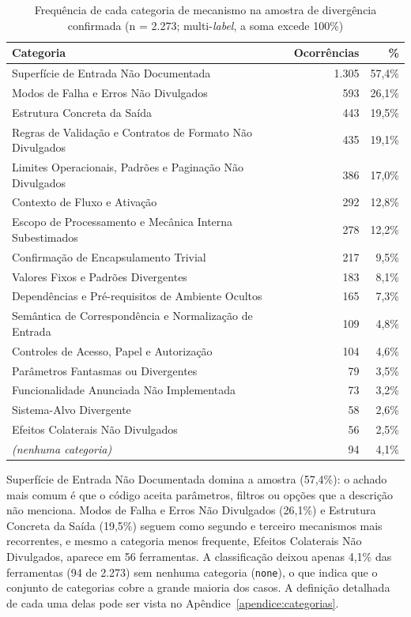 \begin{table}[htbp]
\centering
\caption{Frequência de cada categoria de mecanismo na amostra de divergência confirmada (n = 2.273; multi-\textit{label}, a soma excede 100\%)}
\label{tab:frequencia-categorias}
\footnotesize
\begin{tabular}{lrr}
\toprule
\textbf{Categoria} & \textbf{Ocorrências} & \textbf{\%} \\
\midrule
Superfície de Entrada Não Documentada & 1.305 & 57,4\% \\
Modos de Falha e Erros Não Divulgados & 593 & 26,1\% \\
Estrutura Concreta da Saída & 443 & 19,5\% \\
Regras de Validação e Contratos de Formato Não Divulgados & 435 & 19,1\% \\
Limites Operacionais, Padrões e Paginação Não Divulgados & 386 & 17,0\% \\
Contexto de Fluxo e Ativação & 292 & 12,8\% \\
Escopo de Processamento e Mecânica Interna Subestimados & 278 & 12,2\% \\
Confirmação de Encapsulamento Trivial & 217 & 9,5\% \\
Valores Fixos e Padrões Divergentes & 183 & 8,1\% \\
Dependências e Pré-requisitos de Ambiente Ocultos & 165 & 7,3\% \\
Semântica de Correspondência e Normalização de Entrada & 109 & 4,8\% \\
Controles de Acesso, Papel e Autorização & 104 & 4,6\% \\
Parâmetros Fantasmas ou Divergentes & 79 & 3,5\% \\
Funcionalidade Anunciada Não Implementada & 73 & 3,2\% \\
Sistema-Alvo Divergente & 58 & 2,6\% \\
Efeitos Colaterais Não Divulgados & 56 & 2,5\% \\
\textit{(nenhuma categoria)} & 94 & 4,1\% \\
\bottomrule
\end{tabular}
\end{table}

Superfície de Entrada Não Documentada domina a amostra (57,4\%): o achado mais comum é que o código aceita parâmetros, filtros ou opções que a descrição não menciona. Modos de Falha e Erros Não Divulgados (26,1\%) e Estrutura Concreta da Saída (19,5\%) seguem como segundo e terceiro mecanismos mais recorrentes, e mesmo a categoria menos frequente, Efeitos Colaterais Não Divulgados, aparece em 56 ferramentas. A classificação deixou apenas 4,1\% das ferramentas (94 de 2.273) sem nenhuma categoria (\texttt{none}), o que indica que o conjunto de categorias cobre a grande maioria dos casos. A definição detalhada de cada uma delas pode ser vista no Apêndice~\ref{apendice:categorias}.


